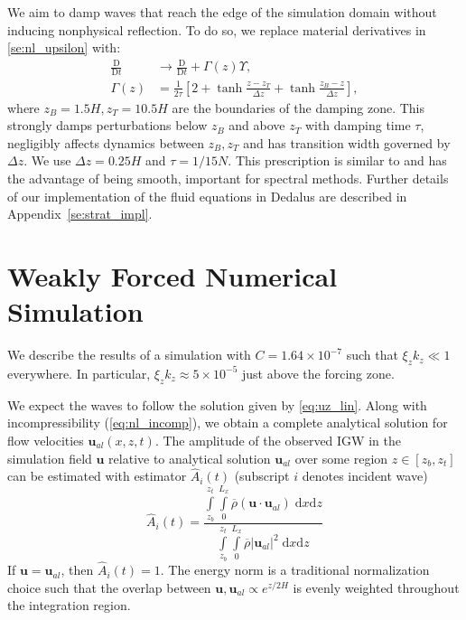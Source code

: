 \documentclass[
        fleqn,
        usenatbib,
    ]{mnras}
\newcommand*{\scinot}[2]{#1\times10^{#2}}
\newcommand*{\md}[2]{\frac{\mathrm{D}#1}{\mathrm{D}#2}}
\newcommand*{\abs}[1]{\left|#1\right|}
\newcommand*{\p}[1]{\left(#1\right)}
\newcommand*{\s}[1]{\left[#1\right]}
\newcommand*{\bm}[1]{\mathbf{#1}}
\begin{document}
We aim to damp waves that reach the edge of the simulation domain without
inducing nonphysical reflection. To do so, we replace material derivatives
in \autoref{se:nl_upsilon} with:
\begin{align}
    \md{}{t} &\to \md{}{t} + \Gamma(z)\Upsilon,\\
    \Gamma(z) &= \frac{1}{2\tau}\s{2 + \tanh \frac{z - z_T}{\Delta z}
        + \tanh \frac{z_B - z}{\Delta z}},\label{eq:Gamma}
\end{align}
where $z_B = 1.5H, z_T = 10.5H$ are the boundaries of the damping zone.
This strongly damps perturbations below $z_B$ and above $z_T$ with damping time
$\tau$, negligibly affects dynamics between $z_B, z_T$ and has transition width
governed by $\Delta z$. We use $\Delta z = 0.25H$ and $\tau = 1/15N$. This
prescription is similar to \citep{lecoanet_damp} and has the advantage of being
smooth, important for spectral methods. Further details of our implementation of
the fluid equations in Dedalus are described in Appendix~\ref{se:strat_impl}.

\section{Weakly Forced Numerical Simulation}\label{s:weak_sim}

We describe the results of a simulation with $C = \scinot{1.64}{-7}$ such that
$\xi_z k_z \ll 1$ everywhere. In particular, $\xi_z k_z \approx \scinot{5}{-5}$
just above the forcing zone.

We expect the waves to follow the solution given by \autoref{eq:uz_lin}. Along
with incompressibility (\autoref{eq:nl_incomp}), we obtain a complete analytical
solution for flow velocities $\bm{u}_{al}(x, z, t)$. The amplitude of the
observed IGW in the simulation field $\bm{u}$ relative to analytical solution
$\bm{u}_{al}$ over some region $z \in [z_b, z_t]$ can be estimated with
estimator $\hat{A}_i(t)$ (subscript $i$ denotes incident wave)
\begin{equation}
    \hat{A}_i(t) = \frac{\int\limits_{z_b}^{z_t}\int\limits_0^{L_x}
        \overline{\rho}\p{\bm{u} \cdot \bm{u}_{al}}\;\mathrm{d}x\mathrm{d}z}
        {\int\limits_{z_b}^{z_t}\int\limits_0^{L_x}
        \overline{\rho}\abs{\bm{u}_{al}}^2\;\mathrm{d}x\mathrm{d}z}
        \label{eq:ahat_def}
\end{equation}
If $\bm{u} = \bm{u}_{al}$, then $\hat{A}_i(t) = 1$. The energy norm is a
traditional normalization choice such that the overlap between $\bm{u},
\bm{u}_{al} \propto e^{z/2H}$ is evenly weighted throughout the integration
region.
\end{document}
